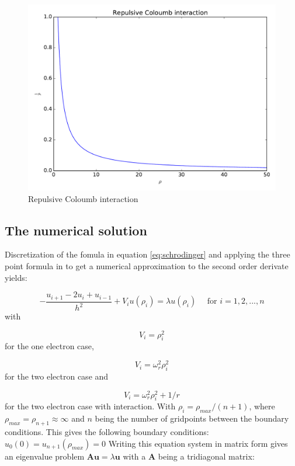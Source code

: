 \documentclass{article}
\begin{document}
\begin{figure}[H]
\centering
    \includegraphics[width=0.8\linewidth]{fig/Repulsion.pdf}
    \caption{Repulsive Coloumb interaction}
    \label{fig:repulsion}
\end{figure}


\subsection{The numerical solution}
Discretization of the fomula in equation \ref{eq:schrodinger} and applying the three point formula in \cite{lectures} to get a numerical approximation to the second order derivate yields:

\begin{equation}
-\frac{u_{i+1} - 2u_i + u_{i-1}}{h^2} + V_iu(\rho_i) = \lambda u(\rho_i) \quad \text{ for $i=1,2,...,n$}
\end{equation}
with 

\begin{equation}
V_i=\rho_i^2
\label{eq:pot_one}
\end{equation}
for the one electron case,

\begin{equation}
V_i=\omega_r^2\rho_i^2
\label{eq:pot_two}
\end{equation}
for the two electron case and 

\begin{equation}
V_i=\omega_r^2\rho_i^2 + 1/r
\label{eq:pot_two_inter}
\end{equation}
for the two electron case with interaction. With $\rho_i = \rho_{max}/(n+1)$, where $\rho_{max}=\rho_{n+1} \approx \infty$ and $n$ being the number of gridpoints between the boundary conditions. This gives the following boundary conditions: $u_0(0)=u_{n+1}(\rho_{max})=0$ Writing this equation system in matrix form gives an eigenvalue problem $\bm{A}\bm{u}=\lambda \bm{u}$ with a $\bm{A}$ being a tridiagonal matrix:
\end{document}
